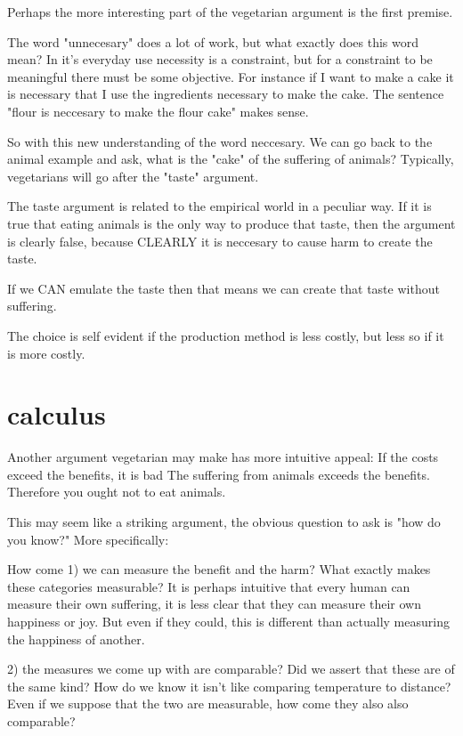 \documentclass[12pt]{report}
\numberwithin{equation}{section}
\begin{document}

Perhaps the more interesting part of the vegetarian argument is the first premise. 

The word "unnecesary" does a lot of work, but what exactly does this word mean? In it's everyday use necessity is a constraint, but for a constraint to be meaningful there must be some objective. For instance if I want to make a cake it is necessary that I use the ingredients necessary to make the cake. The sentence "flour is neccesary to make the flour cake" makes sense.

So with this new understanding of the word neccesary. We can go back to the animal example and ask, what is the "cake" of the suffering of animals? Typically, vegetarians will go after the "taste" argument.

The taste argument is related to the empirical world in a peculiar way. If it is true that eating animals is the only way to produce that taste, then the argument is clearly false, because CLEARLY it is neccesary to cause harm to create the taste.

If we CAN emulate the taste then that means we can create that taste without suffering. 

The choice is self evident if the production method is less costly, but less so if it is more costly. 


\section{calculus}

Another argument vegetarian may make has more intuitive appeal:
If the costs exceed the benefits, it is bad
The suffering from animals exceeds the benefits.
Therefore you ought not to eat animals. 

This may seem like a striking argument, the obvious question to ask is "how do you know?" More specifically:

How come 1) we can measure the benefit and the harm? What exactly makes these categories measurable? It is perhaps intuitive that every human can measure their own suffering, it is less clear that they can measure their own happiness or joy. But even if they could, this is different than actually measuring the happiness of another. 

2) the measures we come up with are comparable? Did we assert that these are of the same kind? How do we know it isn't like comparing temperature to distance? Even if we suppose that the two are measurable, how come they also also comparable?  
\end{document}
